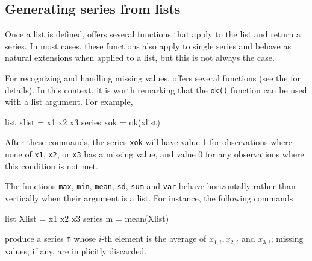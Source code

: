 \subsection{Generating series from lists}

Once a list is defined,  offers several functions that
apply to the list and return a series. In most cases, these functions
also apply to single series and behave as natural extensions when
applied to a list, but this is not always the case.

For recognizing and handling missing values,  offers
several functions (see the \GCR{} for details). In this context, it is
worth remarking that the \texttt{ok()} function can be used with a
list argument.  For example,
%
\begin{code}
list xlist = x1 x2 x3
series xok = ok(xlist)
\end{code}
%
After these commands, the series \texttt{xok} will have value 1 for
observations where none of \texttt{x1}, \texttt{x2}, or
\texttt{x3} has a missing value, and value 0 for any observations
where this condition is not met.

The functions \texttt{max}, \texttt{min}, \texttt{mean}, \texttt{sd},
\texttt{sum} and \texttt{var} behave horizontally rather than
vertically when their argument is a list. For instance, the following
commands
\begin{code}
  list Xlist = x1 x2 x3
  series m = mean(Xlist)
\end{code}
produce a series \texttt{m} whose $i$-th element is the average of
$x_{1,i}, x_{2,i}$ and $x_{3,i}$; missing values, if any, are implicitly discarded.

